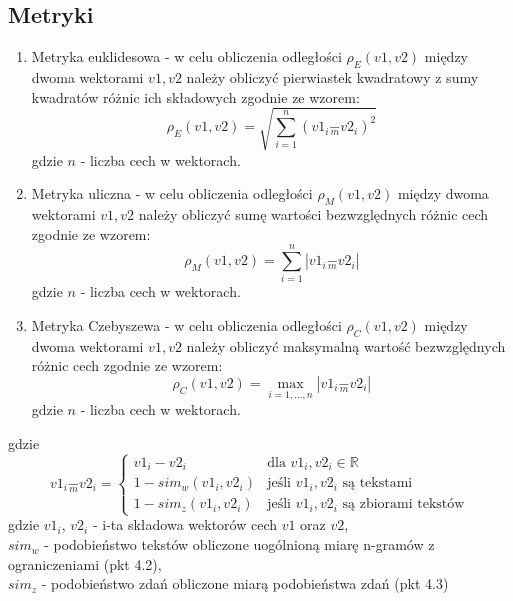 \documentclass{article}
\begin{document}
\subsection{Metryki}
\begin{enumerate}
    \item Metryka euklidesowa - w celu obliczenia odległości \(\rho_E(v1, v2)\) między dwoma wektorami \(v1, v2\) należy obliczyć pierwiastek kwadratowy z sumy kwadratów różnic ich składowych zgodnie ze wzorem:
        \begin{equation}
      \rho_E(v1, v2) = \sqrt{\sum_{i=1}^{n} (v1_i \underset{m}{-} v2_i)^2}  
        \end{equation}
        gdzie \(n\) - liczba cech w wektorach.
        
    \item Metryka uliczna - w celu obliczenia odległości \(\rho_M(v1, v2)\) między dwoma wektorami \(v1, v2\) należy obliczyć sumę wartości bezwzględnych różnic cech zgodnie ze wzorem:
        \begin{equation}
          \rho_M(v1, v2) = \sum_{i=1}^{n} |v1_i \underset{m}{-} v2_i|
        \end{equation}
        gdzie \(n\) - liczba cech w wektorach.
        
    \item Metryka Czebyszewa - w celu obliczenia odległości \(\rho_C(v1, v2)\) między dwoma wektorami \(v1, v2\) należy obliczyć maksymalną wartość bezwzględnych różnic cech zgodnie ze wzorem:
        \begin{equation}
          \rho_C(v1, v2) = \max_{i = 1,...,n} |v1_i \underset{m}{-} v2_i|
        \end{equation}
        gdzie \(n\) - liczba cech w wektorach.
\end{enumerate}
gdzie 
\[
    v1_i \underset{m}{-} v2_i = 
    \begin{cases}
    v1_i - v2_i & \text{dla } v1_i, v2_i \in \mathbb{R} \\
    1 - sim_w(v1_i, v2_i) & \text{jeśli } v1_i, v2_i \text{ są tekstami}\\
    1 - sim_z(v1_i, v2_i) & \text{jeśli } v1_i, v2_i \text{ są zbiorami tekstów}
    \end{cases}
\]
gdzie \(v1_i\), \(v2_i\) - i-ta składowa wektorów cech \(v1\) oraz \(v2\),\\ \(sim_w\) - podobieństwo tekstów obliczone uogólnioną miarę n-gramów z ograniczeniami (pkt 4.2),\\ \(sim_z\) - podobieństwo zdań obliczone miarą podobieństwa zdań (pkt 4.3)\\
\end{document}
